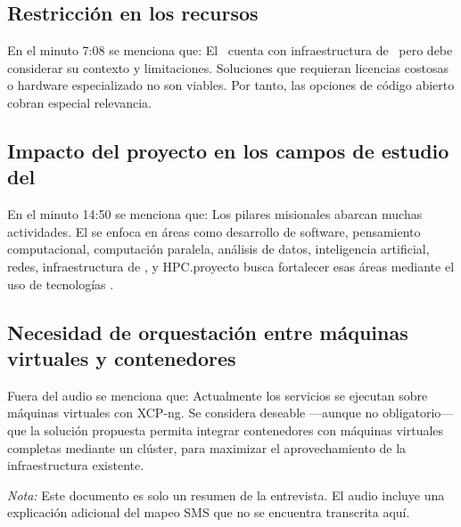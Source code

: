 \subsection{Restricción en los recursos}
En el minuto 7:08 se menciona que: El \GRID\ cuenta con infraestructura de \TI\, pero debe considerar su contexto y limitaciones. Soluciones que requieran licencias costosas o hardware especializado no son viables. Por tanto, las opciones de código abierto cobran especial relevancia.

\subsection{Impacto del proyecto en los campos de estudio del \GRID}
En el minuto 14:50 se menciona que: Los pilares misionales abarcan muchas actividades. El \GRID se enfoca en áreas como desarrollo de software, pensamiento computacional, computación paralela, análisis de datos, inteligencia artificial, redes, infraestructura de \TI, y HPC.\@Este proyecto busca fortalecer esas áreas mediante el uso de tecnologías \VBC.\@

\subsection{Necesidad de orquestación entre máquinas virtuales y contenedores}
Fuera del audio se menciona que: Actualmente los servicios se ejecutan sobre máquinas virtuales con XCP-ng. Se considera deseable —aunque no obligatorio— que la solución propuesta permita integrar contenedores con máquinas virtuales completas mediante un clúster, para maximizar el aprovechamiento de la infraestructura existente.

\bigskip\noindent \textit{Nota:} Este documento es solo un resumen de la entrevista. El audio incluye una explicación adicional del mapeo SMS que no se encuentra transcrita aquí.
